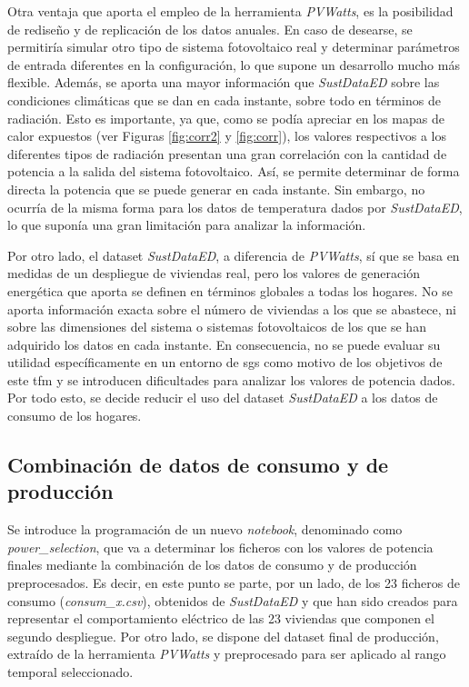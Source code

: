 \vspace{3mm}
\pagebreak

Otra ventaja que aporta el empleo de la herramienta \textit{PVWatts}, es la posibilidad de rediseño y de replicación de los datos anuales. En caso de desearse, se permitiría simular otro tipo de sistema fotovoltaico real y determinar parámetros de entrada diferentes en la configuración, lo que supone un desarrollo mucho más flexible. Además, se aporta una mayor información que \textit{SustDataED} sobre las condiciones climáticas que se dan en cada instante, sobre todo en términos de radiación. Esto es importante, ya que, como se podía apreciar en los mapas de calor expuestos (ver Figuras \ref{fig:corr2} y \ref{fig:corr}), los valores respectivos a los diferentes tipos de radiación presentan una gran correlación con la cantidad de potencia a la salida del sistema fotovoltaico. Así, se permite determinar de forma directa la potencia que se puede generar en cada instante. Sin embargo, no ocurría de la misma forma para los datos de  temperatura dados por \textit{SustDataED}, lo que suponía una gran limitación para analizar la información.

\vspace{3mm}

Por otro lado, el dataset \textit{SustDataED}, a diferencia de \textit{PVWatts}, sí que se basa en medidas de un despliegue de viviendas real, pero los valores de generación energética que aporta se definen en términos globales a todas los hogares. No se aporta información exacta sobre el número de viviendas a los que se abastece, ni sobre las dimensiones del sistema o sistemas fotovoltaicos de los que se han adquirido los datos en cada instante. En consecuencia, no se puede evaluar su utilidad específicamente en un entorno de \gls{sg}s como motivo de los objetivos de este \gls{tfm} y se introducen dificultades para analizar los valores de potencia dados. Por todo esto, se decide reducir el uso del dataset \textit{SustDataED} a los datos de consumo de los hogares.

\subsection{Combinación de datos de consumo y de producción}
\label{sec:combinacion}

Se introduce la programación de un nuevo \textit{notebook}, denominado como \textit{power\_selection}, que va a determinar los ficheros con los valores de potencia finales mediante la combinación de los datos de consumo y de producción preprocesados. Es decir, en este punto se parte, por un lado, de los 23 ficheros de consumo (\textit{consum\_x.csv}), obtenidos de \textit{SustDataED} y que han sido creados para representar el comportamiento eléctrico de las 23 viviendas que componen el segundo despliegue. Por otro lado, se dispone del dataset final de producción, extraído de la herramienta \textit{PVWatts} y preprocesado para ser aplicado al rango temporal seleccionado. 

